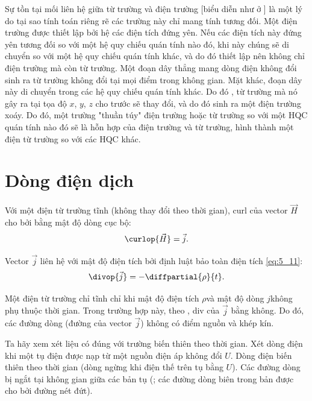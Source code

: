 Sự tồn tại mối liên hệ giữa từ trường và điện trường [biểu diễn như ở ] là một lý do tại sao tính toán riêng rẽ các trường này chỉ mang tính tương đối.
Một điện trường được thiết lập bởi hệ các điện tích đứng yên.
Nếu các điện tích này đứng yên tương đối so với một hệ quy chiếu quán tính nào đó, khi này chúng sẽ di chuyển so với một hệ quy chiếu quán tính khác, và do đó thiết lập nên không chỉ điện trường mà còn từ trường.
Một đoạn dây thẳng mang dòng điện không đổi sinh ra từ trường không đổi tại mọi điểm trong không gian.
Mặt khác, đoạn dây này di chuyển trong các hệ quy chiếu quán tính khác.
Do đó , từ trường mà nó gây ra tại tọa độ $x$, $y$, $z$ cho trước sẽ thay đổi, và do đó sinh ra một điện trường xoáy.
Do đó, một trường "thuần túy" điện trường hoặc từ trường so với một HQC quán tính nào đó sẽ là hỗn hợp của điện trường và từ trường, hình thành một điện từ trường so với các HQC khác.

\section{Dòng điện dịch}\label{sec:9_2}

Với một điện từ trường tĩnh (\ie không thay đổi theo thời gian), curl của vector $\vec{H}$ cho bởi  bằng mật độ dòng cục bộ:
\begin{equation*}
    \curlop{\vec{H}} = \vec{j}.
\end{equation*}

\noindent
Vector $\vec{j}$ liên hệ với mật độ điện tích bởi định luật bảo toàn điện tích \eqref{eq:5_11}:
\begin{equation*}
    \divop{\vec{j}} = - \diffpartial{\rho}{t}.
\end{equation*}

Một điện từ trường chỉ tĩnh chỉ khi mật độ điện tích $\rho$và mật độ dòng $j$không phụ thuộc thời gian.
Trong trường hợp này, theo  , div của $\vec{j}$ bằng không.
Do đó, các đường dòng (đường của vector $\vec{j}$) không có điểm nguồn và khép kín.

Ta hãy xem xét liệu  có đúng với trường biến thiên theo thời gian.
Xét dòng điện khi một tụ điện được nạp từ một nguồn điện áp không đổi $U$.
Dòng điện biến thiên theo thời gian (dòng ngừng khi điện thế trên tụ bằng $U$).
Các đường dòng bị ngắt tại không gian giữa các bản tụ (; các đường dòng biên trong bản được cho bởi đường nét đứt).

